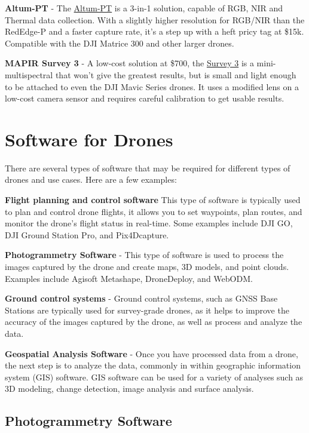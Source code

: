 \documentclass[
  12pt,
]{book}
\begin{document}
\textbf{Altum-PT} - The \href{https://ageagle.com/drone-sensors/altum-pt/}{Altum-PT} is a 3-in-1 solution, capable of RGB, NIR and Thermal data collection. With a slightly higher resolution for RGB/NIR than the RedEdge-P and a faster capture rate, it's a step up with a heft pricy tag at \$15k. Compatible with the DJI Matrice 300 and other larger drones.

\textbf{MAPIR Survey 3} - A low-cost solution at \$700, the \href{https://www.mapir.camera/pages/survey3-cameras}{Survey 3} is a mini-multispectral that won't give the greatest results, but is small and light enough to be attached to even the DJI Mavic Series drones. It uses a modified lens on a low-cost camera sensor and requires careful calibration to get usable results.

\section{Software for Drones}\label{software-for-drones}

There are several types of software that may be required for different types of drones and use cases. Here are a few examples:

\textbf{Flight planning and control software} This type of software is typically used to plan and control drone flights, it allows you to set waypoints, plan routes, and monitor the drone's flight status in real-time. Some examples include DJI GO, DJI Ground Station Pro, and Pix4Dcapture.

\textbf{Photogrammetry Software} - This type of software is used to process the images captured by the drone and create maps, 3D models, and point clouds. Examples include Agisoft Metashape, DroneDeploy, and WebODM.

\textbf{Ground control systems} - Ground control systems, such as GNSS Base Stations are typically used for survey-grade drones, as it helps to improve the accuracy of the images captured by the drone, as well as process and analyze the data.

\textbf{Geospatial Analysis Software} - Once you have processed data from a drone, the next step is to analyze the data, commonly in within geographic information system (GIS) software. GIS software can be used for a variety of analyses such as 3D modeling, change detection, image analysis and surface analysis.

\subsection{Photogrammetry Software}\label{photogrammetry-software}
\end{document}
